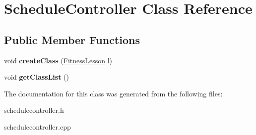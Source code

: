 \hypertarget{class_schedule_controller}{\section{Schedule\-Controller Class Reference}
\label{class_schedule_controller}
}
\subsection*{Public Member Functions}
\begin{DoxyCompactItemize}
\item 
\hypertarget{class_schedule_controller_a3c8ff579f30865270072b43043047f88}{void {\bfseries create\-Class} (\hyperlink{class_fitness_lesson}{Fitness\-Lesson} l)}\label{class_schedule_controller_a3c8ff579f30865270072b43043047f88}

\item 
\hypertarget{class_schedule_controller_ae12d0dbcfc66e3b40938284237376c0d}{void {\bfseries get\-Class\-List} ()}\label{class_schedule_controller_ae12d0dbcfc66e3b40938284237376c0d}

\end{DoxyCompactItemize}


The documentation for this class was generated from the following files\-:\begin{DoxyCompactItemize}
\item 
schedulecontroller.\-h\item 
schedulecontroller.\-cpp\end{DoxyCompactItemize}

